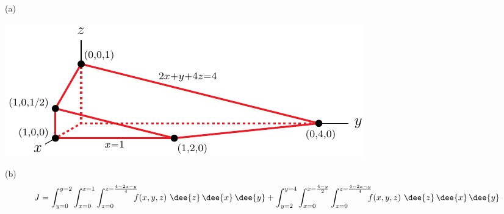%

\begin{answer}
(a)

\begin{center}
     \includegraphics{fig/OE06D_6a3.pdf}
\end{center}

(b)
\begin{align*}
J = \int_{y=0}^{y=2} \int_{x=0}^{x=1} \int_{z=0}^{z=\frac{4-2x-y}{4}}
        \!\!\!\! f(x,y,z)  \ \dee{z}\,\dee{x}\,\dee{y}
+\int_{y=2}^{y=4} \int_{x=0}^{x=\frac{4-y}{2}} \int_{z=0}^{z=\frac{4-2x-y}{4}} 
        \!\!\!\!  f(x,y,z)\ \dee{z}\,\dee{x}\,\dee{y}
\end{align*}

\end{answer}

